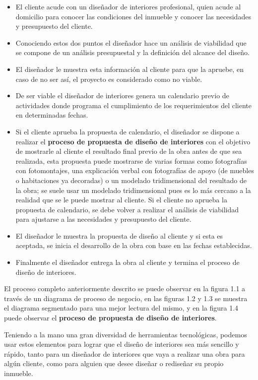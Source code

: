 \begin{itemize}
	\item El cliente acude con un diseñador de interiores profesional, quien acude al domicilio para conocer las condiciones del inmueble y conocer las necesidades y presupuesto del cliente.
	\item Conociendo estos dos puntos el diseñador hace un análisis de viabilidad que se compone de un análisis presupuestal y la definición del alcance del diseño.
	\item El diseñador le muestra esta información al cliente para que la apruebe, en caso de no ser así, el proyecto es considerado como no viable.
	\item De ser viable el diseñador de interiores genera un calendario previo de actividades donde programa el cumplimiento de los requerimientos del cliente en determinadas fechas.
	\item Si el cliente aprueba la propuesta de calendario, el diseñador se dispone a realizar el \textbf{proceso de propuesta de diseño de interiores} con el objetivo de mostrarle al cliente el resultado final previo de la obra antes de que sea realizada, esta propuesta puede mostrarse de varias formas como fotografías con fotomontajes, una explicación verbal con fotografías de apoyo (de muebles o habitaciones ya decoradas) o un modelado tridimensional del resultado de la obra; se suele usar un modelado tridimensional pues es lo más cercano a la realidad que se le puede mostrar al cliente. Si el cliente no aprueba la propuesta de calendario, se debe volver a realizar el análisis de viabilidad para ajustarse a las necesidades y presupuesto del cliente.
	\item El diseñador le muestra la propuesta de diseño al cliente y si esta es aceptada, se inicia el desarrollo de la obra con base en las fechas establecidas.
	\item Finalmente el diseñador entrega la obra al cliente y termina el proceso de diseño de interiores.
\end{itemize}

El proceso completo anteriormente descrito se puede observar en la figura 1.1 a través de un diagrama de proceso de negocio, en las figuras 1.2 y 1.3 se muestra el diagrama segmentado para una mejor lectura del mismo, y en la figura 1.4 puede observar el \textbf{proceso de propuesta de diseño de interiores}.\par
Teniendo a la mano una gran diversidad de herramientas tecnológicas, podemos usar estos elementos para lograr que el diseño de interiores sea más sencillo y rápido, tanto para un diseñador de interiores que vaya a realizar una obra para algún cliente, como para alguien que desee diseñar o rediseñar su propio inmueble.
\newpage

